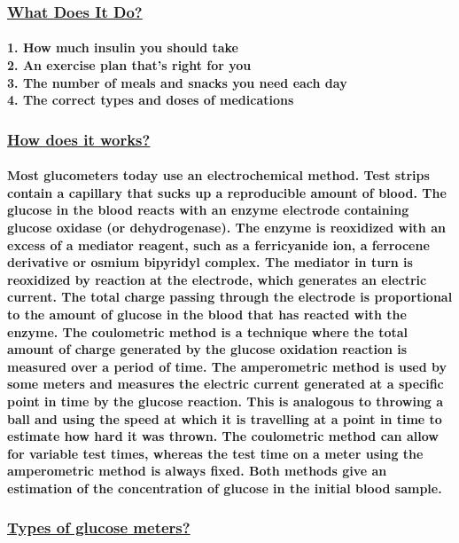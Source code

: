 \documentclass[12pt]{article}
\begin{document}
    \subsubsection{\underline{What Does It Do?}}
    \paragraph{\textbf{1.} How much insulin you should take
    	\\\textbf{2.} An exercise plan that’s right for you
    	\\\textbf{3.} The number of meals and snacks you need each day
    	\\\textbf{4.} The correct types and doses of medications
    }
    \subsubsection{\underline{How does it works?}}
    \paragraph{Most glucometers today use an electrochemical method. Test strips contain a capillary that sucks up a reproducible amount of blood. The glucose in the blood reacts with an enzyme electrode containing glucose oxidase (or dehydrogenase). The enzyme is reoxidized with an excess of a mediator reagent, such as a ferricyanide ion, a ferrocene derivative or osmium bipyridyl complex. The mediator in turn is reoxidized by reaction at the electrode, which generates an electric current. The total charge passing through the electrode is proportional to the amount of glucose in the blood that has reacted with the enzyme. The coulometric method is a technique where the total amount of charge generated by the glucose oxidation reaction is measured over a period of time. The amperometric method is used by some meters and measures the electric current generated at a specific point in time by the glucose reaction. This is analogous to throwing a ball and using the speed at which it is travelling at a point in time to estimate how hard it was thrown. The coulometric method can allow for variable test times, whereas the test time on a meter using the amperometric method is always fixed. Both methods give an estimation of the concentration of glucose in the initial blood sample.
    }
    \subsubsection{\underline{Types of glucose meters?}}
\end{document}
